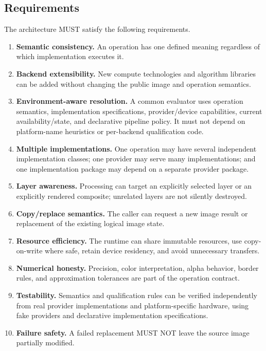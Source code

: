 \documentclass[11pt,a4paper,oneside]{article}
\begin{document}
\subsection{Requirements}

The architecture MUST satisfy the following requirements.
\begin{enumerate}
  \item \textbf{Semantic consistency.} An operation has one defined meaning regardless of which implementation executes it.
  \item \textbf{Backend extensibility.} New compute technologies and algorithm libraries can be added without changing the public image and operation semantics.
  \item \textbf{Environment-aware resolution.} A common evaluator uses operation semantics, implementation specifications, provider/device capabilities, current availability/state, and declarative pipeline policy. It must not depend on platform-name heuristics or per-backend qualification code.
  \item \textbf{Multiple implementations.} One operation may have several independent implementation classes; one provider may serve many implementations; and one implementation package may depend on a separate provider package.
  \item \textbf{Layer awareness.} Processing can target an explicitly selected layer or an explicitly rendered composite; unrelated layers are not silently destroyed.
  \item \textbf{Copy/replace semantics.} The caller can request a new image result or replacement of the existing logical image state.
  \item \textbf{Resource efficiency.} The runtime can share immutable resources, use copy-on-write where safe, retain device residency, and avoid unnecessary transfers.
  \item \textbf{Numerical honesty.} Precision, color interpretation, alpha behavior, border rules, and approximation tolerances are part of the operation contract.
  \item \textbf{Testability.} Semantics and qualification rules can be verified independently from real provider implementations and platform-specific hardware, using fake providers and declarative implementation specifications.
  \item \textbf{Failure safety.} A failed replacement MUST NOT leave the source image partially modified.
\end{enumerate}
\end{document}
